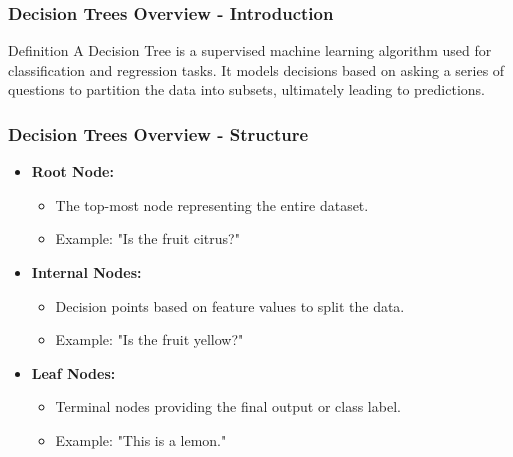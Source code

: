 \documentclass[aspectratio=169]{beamer}
\begin{document}
\begin{frame}[fragile]
    \frametitle{Decision Trees Overview - Introduction}
    \begin{block}{Definition}
        A Decision Tree is a supervised machine learning algorithm used for classification and regression tasks. It models decisions based on asking a series of questions to partition the data into subsets, ultimately leading to predictions.
    \end{block}
\end{frame}

\begin{frame}[fragile]
    \frametitle{Decision Trees Overview - Structure}
    \begin{itemize}
        \item \textbf{Root Node:}
          \begin{itemize}
              \item The top-most node representing the entire dataset.
              \item Example: "Is the fruit citrus?"
          \end{itemize}
        
        \item \textbf{Internal Nodes:}
          \begin{itemize}
              \item Decision points based on feature values to split the data.
              \item Example: "Is the fruit yellow?" 
          \end{itemize}
        
        \item \textbf{Leaf Nodes:}
          \begin{itemize}
              \item Terminal nodes providing the final output or class label.
              \item Example: "This is a lemon."
          \end{itemize}
    \end{itemize}
\end{frame}
\end{document}
